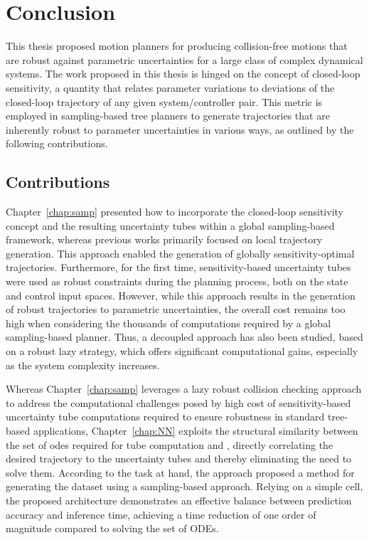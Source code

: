 \chapter{Conclusion}\label{chap:concl}

\glsresetall

This thesis proposed motion planners for producing collision-free motions that are robust against parametric uncertainties for a large class of complex dynamical systems. 
The work proposed in this thesis is hinged on the concept of closed-loop sensitivity, a quantity that relates parameter variations to deviations of the closed-loop trajectory of any given system/controller pair.
This metric is employed in sampling-based tree planners to generate trajectories that are inherently robust to parameter uncertainties in various ways, as outlined by the following contributions.

\section{Contributions}

Chapter~\ref{chap:samp} presented how to incorporate the closed-loop sensitivity concept and the resulting uncertainty tubes within a global sampling-based framework, whereas previous works primarily focused on local trajectory generation.
This approach enabled the generation of globally sensitivity-optimal trajectories. 
Furthermore, for the first time, sensitivity-based uncertainty tubes were used as robust constraints during the planning process, both on the state and control input spaces.
However, while this approach results in the generation of robust trajectories to parametric uncertainties, the overall cost remains too high when considering the thousands of computations required by a global sampling-based planner.
Thus, a decoupled approach has also been studied, based on a robust lazy strategy, which offers significant computational gains, especially as the system complexity increases.

Whereas Chapter~\ref{chap:samp} leverages a lazy robust collision checking approach to address the computational challenges posed by high cost of sensitivity-based uncertainty tube computations required to ensure robustness in standard tree-based applications, Chapter~\ref{chap:NN} exploits the structural similarity between the set of \gls{odes} required for tube computation and , directly correlating the desired trajectory to the uncertainty tubes and thereby eliminating the need to solve them.
According to the task at hand, the approach proposed a method for generating the dataset using a sampling-based approach.
Relying on a simple  cell, the proposed architecture demonstrates an effective balance between prediction accuracy and inference time, achieving a time reduction of one order of magnitude compared to solving the set of ODEs.

